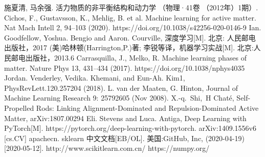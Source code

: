 \begin{thebibliography}{20}
 施夏清, 马余强. 活力物质的非平衡结构和动力学 （物理·41卷 （2012年）1期）.
 Cichos, F., Gustavsson, K., Mehlig, B. et al. Machine learning for active matter. Nat Mach Intell 2, 94–103 (2020). https://doi.org/10.1038/s42256-020-0146-9
 Ian. Goodfellow, Yoshua. Bengio and Aaron. Courville, 深度学习[M]. 北京: 人民邮电出版社，2017
 (美)哈林顿(Harrington,P.)著; 李锐等译，机器学习实战[M]. 北京:人民邮电出版社，2013.6
 Carrasquilla, J., Melko, R. Machine learning phases of matter. Nature Phys 13, 431–434 (2017). https://doi.org/10.1038/nphys4035
 Jordan. Venderley, Vedika. Khemani, and Eun-Ah. Kim1, PhysRevLett.120.257204 (2018).
 L. van der Maaten, G. Hinton, Journal of Machine Learning Research 9: 25792605 (Nov 2008).
 X.-q. Shi, H Chaté, Self-Propelled Rods: Linking Alignment-Dominated and Repulsion-Dominated Active Matter, arXiv:1807.00294
 Eli. Stevens and Luca. Antiga, Deep Learning with PyTorch[M]. https://pytorch.org/deep-learning-with-pytorch.
 arXiv:1409.1556v6 [cs.CV]
 apachecn. sklearn 中文文档[EB/OL]. 美国:GitHub, Inc, (2020-04-19)[2020-05-12]. http://www.scikitlearn.com.cn/
 https://numpy.org/
\end{thebibliography}
